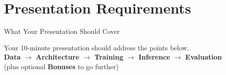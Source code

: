 \documentclass[aspectratio=169]{beamer}
\begin{document}
\section{Presentation Requirements}

\begin{frame}{What Your Presentation Should Cover}
  \begin{center}
    \vspace{0.4cm}
    \large Your 10-minute presentation should address the points below.\\[0.5cm]
    \small
    \textbf{Data} $\rightarrow$ \textbf{Architecture} $\rightarrow$
    \textbf{Training} $\rightarrow$ \textbf{Inference} $\rightarrow$
    \textbf{Evaluation} \\[0.2cm]
    (plus optional \textbf{Bonuses} to go further)
  \end{center}
\end{frame}
\end{document}

